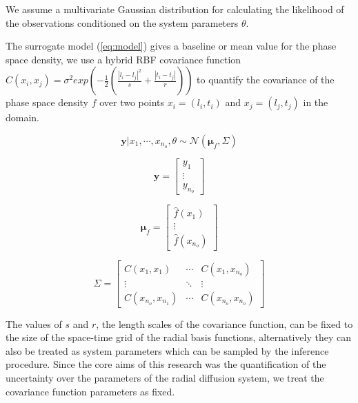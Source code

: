 We assume a multivariate Gaussian distribution for calculating the likelihood of 
the observations conditioned on the system parameters $\theta$. 

The surrogate model (\cref{eq:model}) gives a baseline or mean value for the phase space density, we use a
hybrid RBF covariance function $C(x_{i}, x_{j}) = \sigma^2 exp(-\frac{1}{2} (\frac{|l_i - l_j|^2}{s} + \frac{|t_i - t_j|}{r}))$
to quantify the covariance of the phase space density $f$ over two points 
$x_i = (l_i, t_i)$ and $x_j = (l_j, t_j)$ in the domain. 

\begin{equation}
\mathbf{y} | x_1, \cdots, x_{n_o}, \theta \sim \mathcal{N} \left(\mathbf{\mu}_f, \Sigma \right )
\end{equation}

\begin{equation}
\mathbf{y} = \begin{bmatrix}
y_1\\ 
\vdots\\ 
y_{n_o}
\end{bmatrix}
\end{equation}

\begin{equation}
  \mathbf{\mu}_f = \begin{bmatrix}
\hat{f}(x_1)\\ 
\vdots\\ 
\hat{f}(x_{n_o})
\end{bmatrix}
\end{equation}

\begin{equation}
    \Sigma = \begin{bmatrix}
C(x_1, x_1) & \cdots  & C(x_1, x_{n_o})\\ 
\vdots & \ddots & \vdots\\ 
C(x_{n_o}, x_{n_{1}}) & \cdots  & C(x_{n_o}, x_{n_{o}})
\end{bmatrix}
\end{equation}

The values of $s$ and $r$, the length scales of the covariance function, 
can be fixed to the size of the space-time grid of the radial basis functions, 
alternatively they can also be treated as system parameters which can be sampled 
by the inference procedure. Since the core aims of this research was the quantification
of the uncertainty over the parameters of the radial diffusion system, 
we treat the covariance function parameters as fixed.

